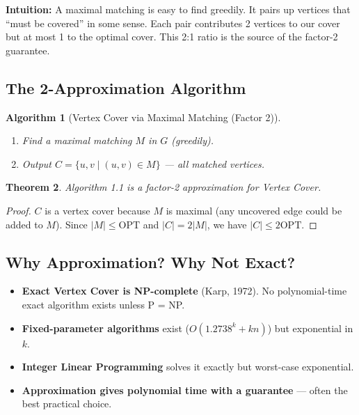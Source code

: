 \documentclass[11pt,oneside]{book}
\newtheorem{theorem}{Theorem}[chapter]
\newtheorem{algorithmdef}[theorem]{Algorithm}
\newcommand{\OPT}{\mathrm{OPT}}
\begin{document}
\begin{intuitionbox}
\textbf{Intuition:} A maximal matching is easy to find greedily. It pairs up vertices that ``must be covered'' in some sense. Each pair contributes 2 vertices to our cover but at most 1 to the optimal cover. This 2:1 ratio is the source of the factor-2 guarantee.
\end{intuitionbox}

\subsection{The 2-Approximation Algorithm}

\begin{algorithmdef}[Vertex Cover via Maximal Matching (Factor 2)]
\begin{enumerate}
    \item Find a maximal matching $M$ in $G$ (greedily).
    \item Output $C = \{u, v \mid (u,v) \in M\}$ — all matched vertices.
\end{enumerate}
\end{algorithmdef}

\begin{theorem}
Algorithm 1.1 is a factor-2 approximation for Vertex Cover.
\end{theorem}
\begin{proof}
$C$ is a vertex cover because $M$ is maximal (any uncovered edge could be added to $M$). Since $|M| \leq \OPT$ and $|C| = 2|M|$, we have $|C| \leq 2\OPT$.
\end{proof}

\subsection{Why Approximation? Why Not Exact?}

\begin{itemize}
    \item \textbf{Exact Vertex Cover is NP-complete} (Karp, 1972). No polynomial-time exact algorithm exists unless P = NP.
    \item \textbf{Fixed-parameter algorithms} exist ($O(1.2738^k + kn)$) but exponential in $k$.
    \item \textbf{Integer Linear Programming} solves it exactly but worst-case exponential.
    \item \textbf{Approximation gives polynomial time with a guarantee} — often the best practical choice.
\end{itemize}
\end{document}
